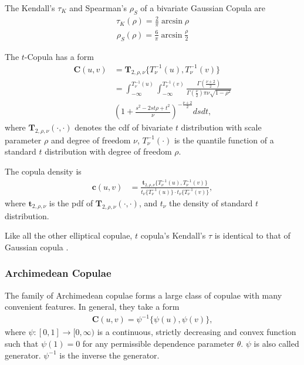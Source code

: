 The Kendall's $\tau_K$ and Spearman's $\rho_S$ of a bivariate Gaussian Copula are
    \begin{align}
        \tau_K(\rho) = \frac{2}{\pi}\arcsin\rho
        \end{align}
    \begin{align}
        \rho_S(\rho) = \frac{6}{\pi}\arcsin\frac{\rho}{2}
        \end{align}\medskip

The $t$-Copula has a form
\begin{align}
        \bm{C}(u,v) &= \bm{T}_{2, \rho, \nu}\{T^{-1}_\nu(u), T^{-1}_\nu(v)\} \nonumber \\
            &= \int_{-\infty}^{T^{-1}_\nu(u)}
               \int_{-\infty}^{T^{-1}_\nu(v)}
            \frac{\Gamma\left(\frac{\nu+2}{2}\right)}
            {\Gamma\left(\frac{\nu}{2}\right)\pi\nu\sqrt{1-\rho^2}}\\
           & \left(
        1+\frac{s^2-2st\rho+t^2}{\nu}
        \right)^{-\frac{\nu+2}{2}} ds dt,
    \end{align}
where $\bm{T}_{2, \rho, \nu}(\cdot, \cdot)$ denotes the cdf of bivariate $t$ distribution with scale parameter $\rho$ and degree of freedom $\nu$,
$T^{-1}_\nu(\cdot)$ is the quantile function of a standard $t$ distribution with degree of freedom $\rho$.

The copula density is
\begin{align}
    \bm{c}(u,v) &= \frac{\bm{t}_{2, \rho, \nu}\{T^{-1}_\nu(u), T^{-1}_\nu(v)\}}
    {t_\nu\{T^{-1}_\nu(u)\}\cdot t_\nu\{T^{-1}_\nu(v)\}},
    \end{align}
where $\bm{t}_{2,\rho, \nu}$ is the pdf of $\bm{T}_{2, \rho, \nu}(\cdot, \cdot)$,
and $t_\nu$ the density of standard $t$ distribution.\medskip

Like all the other elliptical copulae, $t$ copula's Kendall's $\tau$ is identical to that of Gaussian copula \citep[see][and references therein]{demarta2005t}.

\subsubsection{Archimedean Copulae}\label{sec:archimedean-copula}
The family of Archimedean copulae forms a large class of copulae with many convenient features.
In general, they take a form
\begin{align}
    \bm{C}(u,v)= \psi^{-1}\{\psi(u), \psi(v)\},
    \end{align}
where $\psi:[0,1] \rightarrow [0,\infty)$ is a continuous, strictly decreasing and convex function such that
$\psi(1)=0$ for any permissible dependence parameter $\theta$. $\psi$ is also called generator.
$\psi^{-1}$ is the inverse the generator.\medskip

